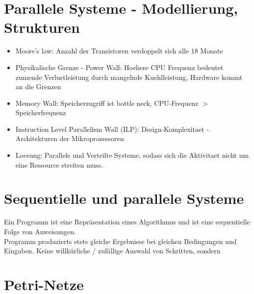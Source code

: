 \section{Parallele Systeme - Modellierung, Strukturen}
\begin{itemize}
	\setlength\itemsep{0em}
	\item Moore's law: Anzahl der Transistoren verdoppelt sich alle 18 Monate
	\item Physikalische Grenze - Power Wall: Hoehere CPU Frequenz bedeutet zumende Verlustleistung durch mangelnde Kuehlleistung, Hardware kommt an die Grenzen
	\item Memory Wall: Speicherzugriff ist bottle neck, CPU-Frequenz $>$ Speicherfrequenz
	\item Instruction Level Parallelism Wall (ILP): Design-Komplexitaet - Architekturen der Mikroprozessoren
	\item Loesung: Parallele und Verteilte Systeme, sodass sich die Aktivitaet nicht um eine Ressource streiten muss. 
\end{itemize}

\section{Sequentielle und parallele Systeme}
Ein Programm ist eine Repräsentation eines Algorithmus und ist eine sequentielle Folge von Anweisungen. \\
 Programm produzierts stets gleiche Ergebnisse bei gleichen Bedingungen und Eingaben.  Keine willkürliche / zufällige Auswahl von Schritten, sondern 

\section{Petri-Netze}





